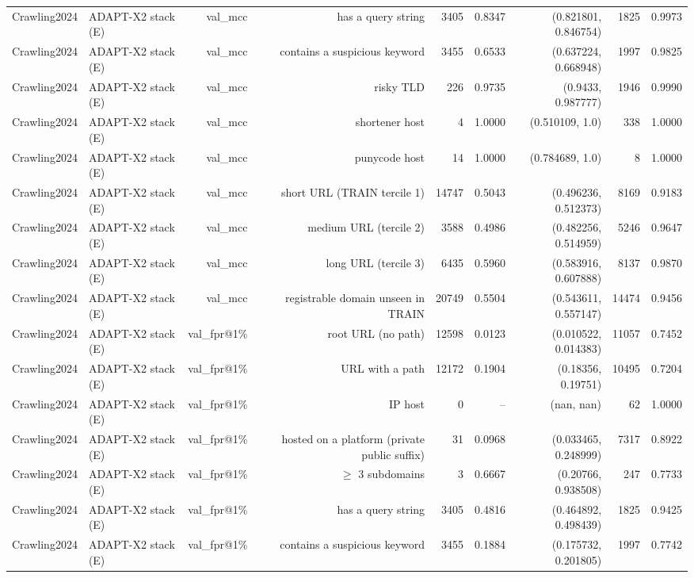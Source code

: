 \begin{table}[t]
\begin{tabular}{llrrrrrrr}
Crawling2024 & ADAPT-X2 stack (E) & val\_mcc & has a query string & 3405 & 0.8347 & (0.821801, 0.846754) & 1825 & 0.9973 \\
Crawling2024 & ADAPT-X2 stack (E) & val\_mcc & contains a suspicious keyword & 3455 & 0.6533 & (0.637224, 0.668948) & 1997 & 0.9825 \\
Crawling2024 & ADAPT-X2 stack (E) & val\_mcc & risky TLD & 226 & 0.9735 & (0.9433, 0.987777) & 1946 & 0.9990 \\
Crawling2024 & ADAPT-X2 stack (E) & val\_mcc & shortener host & 4 & 1.0000 & (0.510109, 1.0) & 338 & 1.0000 \\
Crawling2024 & ADAPT-X2 stack (E) & val\_mcc & punycode host & 14 & 1.0000 & (0.784689, 1.0) & 8 & 1.0000 \\
Crawling2024 & ADAPT-X2 stack (E) & val\_mcc & short URL (TRAIN tercile 1) & 14747 & 0.5043 & (0.496236, 0.512373) & 8169 & 0.9183 \\
Crawling2024 & ADAPT-X2 stack (E) & val\_mcc & medium URL (tercile 2) & 3588 & 0.4986 & (0.482256, 0.514959) & 5246 & 0.9647 \\
Crawling2024 & ADAPT-X2 stack (E) & val\_mcc & long URL (tercile 3) & 6435 & 0.5960 & (0.583916, 0.607888) & 8137 & 0.9870 \\
Crawling2024 & ADAPT-X2 stack (E) & val\_mcc & registrable domain unseen in TRAIN & 20749 & 0.5504 & (0.543611, 0.557147) & 14474 & 0.9456 \\
Crawling2024 & ADAPT-X2 stack (E) & val\_fpr@1\% & root URL (no path) & 12598 & 0.0123 & (0.010522, 0.014383) & 11057 & 0.7452 \\
Crawling2024 & ADAPT-X2 stack (E) & val\_fpr@1\% & URL with a path & 12172 & 0.1904 & (0.18356, 0.19751) & 10495 & 0.7204 \\
Crawling2024 & ADAPT-X2 stack (E) & val\_fpr@1\% & IP host & 0 & -- & (nan, nan) & 62 & 1.0000 \\
Crawling2024 & ADAPT-X2 stack (E) & val\_fpr@1\% & hosted on a platform (private public suffix) & 31 & 0.0968 & (0.033465, 0.248999) & 7317 & 0.8922 \\
Crawling2024 & ADAPT-X2 stack (E) & val\_fpr@1\% & $\geq$ 3 subdomains & 3 & 0.6667 & (0.20766, 0.938508) & 247 & 0.7733 \\
Crawling2024 & ADAPT-X2 stack (E) & val\_fpr@1\% & has a query string & 3405 & 0.4816 & (0.464892, 0.498439) & 1825 & 0.9425 \\
Crawling2024 & ADAPT-X2 stack (E) & val\_fpr@1\% & contains a suspicious keyword & 3455 & 0.1884 & (0.175732, 0.201805) & 1997 & 0.7742 \\

\end{tabular}
\end{table}
